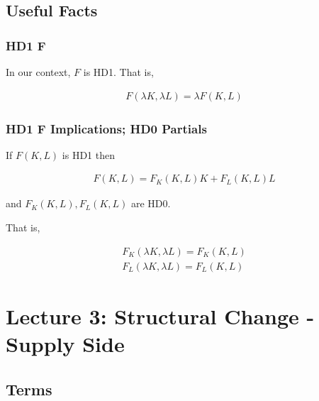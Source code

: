 \documentclass[10pt]{article}
\begin{document}
\subsection{Useful Facts}

\subsubsection{HD1 F}

In our context, $F$ is HD1. That is,

\begin{align}
    F(\lambda K, \lambda L)=\lambda F(K, L)
\end{align}

\subsubsection{HD1 F Implications; HD0 Partials}

If $F(K, L)$ is HD1 then

\begin{align}
    F(K, L)=F_K(K, L) K+F_L(K, L) L \label{eq:l2_hd1_lemma}
\end{align}

and $F_K(K, L), F_L(K, L)$ are HD0.

That is,

\begin{align}
    F_K(\lambda K,\lambda L) = F_K(K, L)\\
    F_L(\lambda K,\lambda L) = F_L(K, L)
\end{align}

\section{Lecture 3: Structural Change - Supply Side}

\subsection{Terms}
\end{document}
